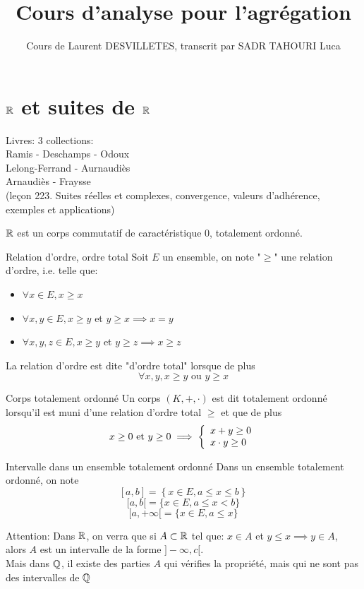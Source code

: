 \documentclass[]{report}
\title{Cours d'analyse pour l'agrégation}
\author{Cours de Laurent DESVILLETES, transcrit par SADR TAHOURI Luca}
\date{}
\begin{document}
\maketitle
\tableofcontents

\chapter{$\mathbb{R}$ et suites de $\mathbb{R}$}

Livres: 3 collections:\\
Ramis - Deschamps - Odoux\\
Lelong-Ferrand - Aurnaudiès\\
Arnaudiès - Fraysse\\

(leçon 223. Suites réelles et complexes, convergence, valeurs d'adhérence, exemples et applications)

$\mathbb{R}$ est un corps commutatif de caractéristique $0$, totalement ordonné.

\begin{df}{Relation d'ordre, ordre total}{}
    Soit $E$ un ensemble, on note "$\ge$" une relation d'ordre, i.e. telle que:
    \begin{itemize}
        \item $\forall x\in E, x\ge x$
        \item $\forall x,y\in E,x\ge y$ et $y\ge x \implies x=y$
        \item $\forall x,y,z\in E,x\ge y$ et $y\ge z\implies x\ge z$
    \end{itemize}
    La relation d'ordre est dite "d'ordre total" lorsque de plus
    \[\forall x,y, x\ge y\text{ ou }y\ge x\]
\end{df}

\begin{df}{Corps totalement ordonné}{}
    Un corps $(K,+,\cdot)$ est dit totalement ordonné lorsqu'il est muni d'une relation d'ordre total $\ge$ et que de plus
    \[x\ge 0\text{ et }y\ge 0\implies \left\{\begin{array}{ll} x+y\ge 0\\ x\cdot y \ge 0 \end{array} \right.\]
\end{df}

\begin{df}{Intervalle dans un ensemble totalement ordonné}{}
    Dans un ensemble totalement ordonné, on note
    \[ \left[a,b\right]=\left\{ x\in E, a\le x\le b\right\}\]
    \[ [a,b[=\{x\in E, a\le x <b\}\]
    \[ [a,+\infty[=\{x\in E, a\le x\}\]
\end{df}

Attention: Dans $\mathbb{R}$, on verra que si $A\subset \mathbb{R}$ tel que: $x\in A$ et $y\le x\implies y\in A$, alors $A$ est un intervalle de la forme $]-\infty,c[$.\\
Mais dans $\mathbb{Q}$, il existe des parties $A$ qui vérifies la propriété, mais qui ne sont pas des intervalles de $\mathbb{Q}$
\end{document}
